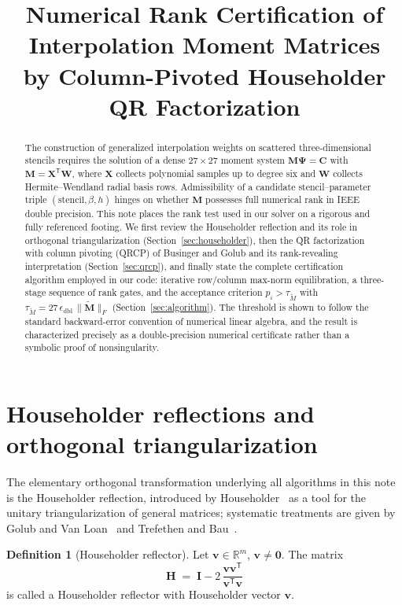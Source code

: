 \documentclass[11pt,a4paper]{article}
\title{Numerical Rank Certification of Interpolation Moment Matrices\\
by Column-Pivoted Householder QR Factorization}
\author{}
\date{}
\theoremstyle{definition}
\newtheorem{definition}[theorem]{Definition}
\newcommand{\R}{\mathbb{R}}
\newcommand{\eps}{\epsilon_{\mathrm{dbl}}}
\newcommand{\Mt}{\widetilde{\bm M}}
\newcommand{\normF}[1]{\|#1\|_{F}}
\begin{document}
\maketitle
\vspace{-3em}

\begin{abstract}
The construction of generalized interpolation weights on scattered
three-dimensional stencils requires the solution of a dense
$27\times27$ moment system $\bm M\bm\Psi=\bm C$ with
$\bm M=\bm X^{\mathsf T}\bm W$, where $\bm X$ collects polynomial
samples up to degree six and $\bm W$ collects Hermite--Wendland radial
basis rows. Admissibility of a candidate stencil--parameter triple
$(\text{stencil},\beta,h)$ hinges on whether $\bm M$ possesses full
numerical rank in IEEE double precision. This note places the rank
test used in our solver on a rigorous and fully referenced footing. We
first review the Householder reflection and its role in orthogonal
triangularization (Section~\ref{sec:householder}), then the QR
factorization with column pivoting (QRCP) of Businger and Golub and
its rank-revealing interpretation (Section~\ref{sec:qrcp}), and
finally state the complete certification algorithm employed in our
code: iterative row/column max-norm equilibration, a three-stage
sequence of rank gates, and the acceptance criterion
$p_i>\tau_{\widetilde M}$ with
$\tau_{\widetilde M}=27\,\eps\,\normF{\Mt}$
(Section~\ref{sec:algorithm}). The threshold is shown to follow the
standard backward-error convention of numerical linear algebra, and
the result is characterized precisely as a double-precision numerical
certificate rather than a symbolic proof of nonsingularity.
\end{abstract}

\section{Householder reflections and orthogonal triangularization}
\label{sec:householder}

The elementary orthogonal transformation underlying all algorithms in
this note is the Householder reflection, introduced by
Householder~\cite{householder1958} as a tool for the unitary
triangularization of general matrices; systematic treatments are given
by Golub and Van Loan~\cite[\S5.1]{golubvanloan2013} and Trefethen and
Bau~\cite[Lecture~10]{trefethenbau1997}.

\begin{definition}[Householder reflector]
\label{def:householder}
Let $\bm v\in\R^{m}$, $\bm v\neq\bm 0$. The matrix
\begin{equation}
  \bm H \;=\; \bm I - 2\,\frac{\bm v\bm v^{\mathsf T}}
                              {\bm v^{\mathsf T}\bm v}
  \label{eq:H-def}
\end{equation}
is called a Householder reflector with Householder vector $\bm v$.
\end{definition}
\end{document}
